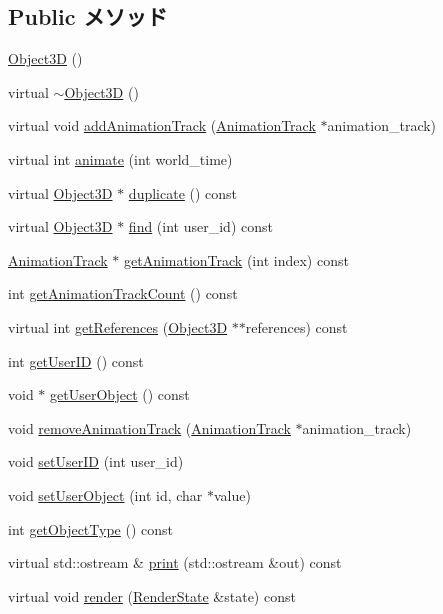 \subsection*{Public メソッド}
\begin{CompactItemize}
\item 
\hyperlink{classm3g_1_1Object3D_f4b10c33b9014a3f0a675ef4b699b773}{Object3D} ()
\item 
virtual \hyperlink{classm3g_1_1Object3D_8ece10725587e63a2c75283c16cc4df5}{$\sim$Object3D} ()
\item 
virtual void \hyperlink{classm3g_1_1Object3D_415c0b110f95410ded9b85e5d99a496b}{addAnimationTrack} (\hyperlink{classm3g_1_1AnimationTrack}{AnimationTrack} $\ast$animation\_\-track)
\item 
virtual int \hyperlink{classm3g_1_1Object3D_8aad1ceab4c2a03609c8a42324ce484d}{animate} (int world\_\-time)
\item 
virtual \hyperlink{classm3g_1_1Object3D}{Object3D} $\ast$ \hyperlink{classm3g_1_1Object3D_a25110dac934f867b83b73ad4741a0f4}{duplicate} () const 
\item 
virtual \hyperlink{classm3g_1_1Object3D}{Object3D} $\ast$ \hyperlink{classm3g_1_1Object3D_01924458161ea59220f2cc29339e2b00}{find} (int user\_\-id) const 
\item 
\hyperlink{classm3g_1_1AnimationTrack}{AnimationTrack} $\ast$ \hyperlink{classm3g_1_1Object3D_f0978f3f2efe3227ca613da3361424dd}{getAnimationTrack} (int index) const 
\item 
int \hyperlink{classm3g_1_1Object3D_0926843b66090795972850376b8e4e6c}{getAnimationTrackCount} () const 
\item 
virtual int \hyperlink{classm3g_1_1Object3D_d52d3c63076c4341b34c3631a17820e4}{getReferences} (\hyperlink{classm3g_1_1Object3D}{Object3D} $\ast$$\ast$references) const 
\item 
int \hyperlink{classm3g_1_1Object3D_b8d9067364251d0208fcdc502d394e2c}{getUserID} () const 
\item 
void $\ast$ \hyperlink{classm3g_1_1Object3D_a9b8541216c1fa7792617218a5fb6672}{getUserObject} () const 
\item 
void \hyperlink{classm3g_1_1Object3D_e36d8f8544daee6bd4e2ccd6755ed03d}{removeAnimationTrack} (\hyperlink{classm3g_1_1AnimationTrack}{AnimationTrack} $\ast$animation\_\-track)
\item 
void \hyperlink{classm3g_1_1Object3D_8eaa86665b4ca2c39691b6efc50108ee}{setUserID} (int user\_\-id)
\item 
void \hyperlink{classm3g_1_1Object3D_990adc7f146e1b5d229e1d8fc3625a24}{setUserObject} (int id, char $\ast$value)
\item 
int \hyperlink{classm3g_1_1Object3D_06be1b37b707b5f227cba2308043f3df}{getObjectType} () const 
\item 
virtual std::ostream \& \hyperlink{classm3g_1_1Object3D_6fea17fa1532df3794f8cb39cb4f911f}{print} (std::ostream \&out) const 
\item 
virtual void \hyperlink{classm3g_1_1Object3D_8babc8a79b78615da51161e94029eea9}{render} (\hyperlink{structm3g_1_1RenderState}{RenderState} \&state) const 
\end{CompactItemize}
